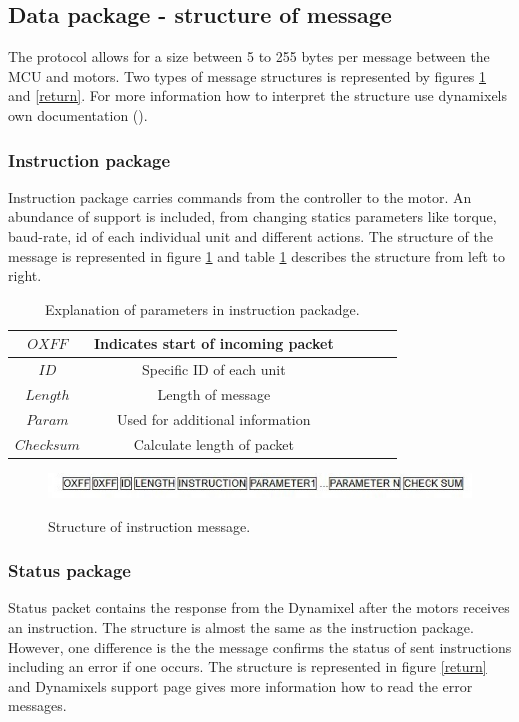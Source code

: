 \subsection{Data package - structure of message}
The protocol allows for a size between 5 to 255 bytes per message between the MCU and motors. 
Two types of message structures is represented by figures \ref{instr} and \ref{return}.
For more information how to interpret the structure use dynamixels own documentation ().

\subsubsection{Instruction package}
Instruction package carries commands from the controller to the motor.
An abundance of support is included,
from changing statics parameters like torque, baud-rate, id of each individual unit and different actions. 
The structure of the message is represented in figure \ref{instr} and table \ref{instr_table} describes the structure from left to right. 

\begin{table}[H]
    \centering
    \caption{Explanation of parameters in instruction packadge.}
    \begin{tabular}{c | c c c c c}
        \(OXFF\) & Indicates start of incoming packet  \\
        \hline
        \(ID\) & Specific ID of each unit  \\
        \hline
        \(Length\) & Length of message \\
        \hline
        \(Param\) & Used for additional information  \\
        \hline
        \(Check sum\) & Calculate length of packet \\
        \hline
    \end{tabular}
    \label{instr_table}
\end{table}

\begin{figure}[H]
    \graphicspath{ {img/} }
    \centering
    
    \includegraphics[width = 9 cm]{img/instruction_packadge}
    \label{instr}
    \caption{Structure of instruction message.}
\end{figure}

\subsubsection{Status package}
Status packet contains the response from the Dynamixel after the motors receives an instruction.
The structure is almost the same as the instruction package.
However, one difference is the the message confirms the status of sent instructions including an error if one occurs.
The structure is represented in figure \ref{return} and Dynamixels support page \cite{protocol1} gives more information how to read the error messages.

